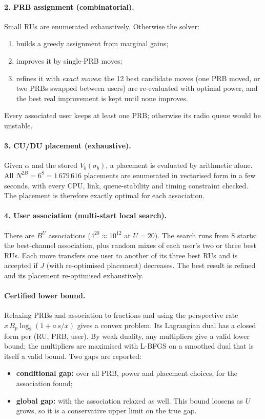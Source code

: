 \documentclass[11pt,oneside]{report}
\begin{document}
\paragraph{2. PRB assignment (combinatorial).}
Small RUs are enumerated exhaustively. Otherwise the solver:
\begin{enumerate}
	\item builds a greedy assignment from marginal gains;
	\item improves it by single-PRB moves;
	\item refines it with \emph{exact moves}: the 12 best candidate moves (one PRB moved, or two PRBs swapped between users) are re-evaluated with optimal power, and the best real improvement is kept until none improves.
\end{enumerate}
Every associated user keeps at least one PRB; otherwise its radio queue would be unstable.

\paragraph{3. CU/DU placement (exhaustive).}
Given $\alpha$ and the stored $V_b(\sigma_b)$, a placement is evaluated by arithmetic alone.
All $N^{2B}=6^8=1\,679\,616$ placements are enumerated in vectorised form in a few seconds, with every CPU, link, queue-stability and timing constraint checked.
The placement is therefore exactly optimal for each association.

\paragraph{4. User association (multi-start local search).}
There are $B^U$ associations ($4^{20}\approx10^{12}$ at $U=20$).
The search runs from 8 starts: the best-channel association, plus random mixes of each user's two or three best RUs.
Each move transfers one user to another of its three best RUs and is accepted if $J$ (with re-optimised placement) decreases.
The best result is refined and its placement re-optimised exhaustively.

\paragraph{Certified lower bound.}
Relaxing PRBs and association to fractions and using the perspective rate $x\,B_p\log_2(1+a\,s/x)$ gives a convex problem.
Its Lagrangian dual has a closed form per (RU, PRB, user). By weak duality, any multipliers give a valid lower bound; the multipliers are maximised with L-BFGS on a smoothed dual that is itself a valid bound. Two gaps are reported:
\begin{itemize}
	\item \textbf{conditional gap:} over all PRB, power and placement choices, for the association found;
	\item \textbf{global gap:} with the association relaxed as well. This bound loosens as $U$ grows, so it is a conservative upper limit on the true gap.
\end{itemize}
\end{document}
